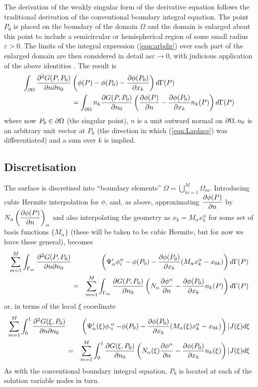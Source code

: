 The derivation of the weakly singular form of the derivative equation follows
the traditional derivation of the conventional boundary integral equation.
The point $P_{0}$ is placed on the boundary of the domain $\Omega$ and the
domain is enlarged about this point to include a semicircular or hemispherical
region of some small radius $\varepsilon > 0$.  The limits of the integral
expression (\ref{eqn:arbdir}) over each part of the enlarged domain are then
considered in detail as$\varepsilon \rightarrow 0$, with judicious application
of the above identities \cite{tomlinson:1996,liu:1991}.  The result is
\begin{eqnarray}
 \int_{\partial\Omega}\frac{\partial^{2}G(P,P_{0})}{\partial n\partial n_{0}}
  &\left(\phi(P)-\phi(P_{0})- \dfrac{\partial \phi(P_{0})}{\partial x_{k}} \right)
  d\Gamma(P)\nonumber\\
  &=\int_{\partial\Omega} n_{k} \dfrac{\partial G(P,P_{0})}{\partial n_{0}} \left(
   \dfrac{\partial \phi(P)}{\partial n} - \dfrac{\partial \phi(P_{0})}{\partial x_{k}} n_{k}(P)\right)
  d\Gamma(P)
 \label{eqn:result}
\end{eqnarray}
where now $P_{0}\in \partial\Omega$ (the singular point), $n$ is a unit outward
normal on $\partial\Omega, n_{0}$ is an arbitrary unit vector at $P_{0}$ (the
direction in which (\ref{eqn:Laplace}) was differentiated) and a sum over $k$
is implied.

\subsection{Discretisation}
The surface is discretised into ``boundary elements'' \ie $\Omega =
\displaystyle{\bigcup_{m=1}^{M}}\Omega_{m}$.  Introducing cubic Hermite
interpolation for $\phi $, and, as above, approximating $ \dfrac{\partial \phi(P)}{\partial n} $
by $N_{\alpha}\left( \dfrac{\partial \phi(P)}{\partial n} \right)_{\alpha}$ and also interpolating
the geometry as $x_{k} = M_{\alpha} x_{k}^{\alpha}$ for some set of basis
functions $\{M_{\alpha}\}$ (these will be taken to be cubic Hermite, but for
now we leave these general),  becomes
\begin{eqnarray}
  \sum_{m=1}^{M}\int_{\Gamma_{m}}\frac{\partial^{2}G(P,P_{0})} {\partial n\partial n_{0}}
  &&\left(\Psi_{\alpha}^{i}\phi_{i}^{\alpha}-\phi(P_{0})
    - \dfrac{\partial \phi(P_{0})}{\partial x_{k}} (M_{\alpha}x_{k}^{\alpha} - x_{0k})
  \right)d\Gamma(P)\nonumber\\ 
  &=&\sum_{m=1}^{M}\int_{\Gamma_{m}} \dfrac{\partial G(P,P_{0})}{\partial n_{0}} \left(
    N_{\alpha} \dfrac{\partial \phi^{\alpha}}{\partial n} - \dfrac{\partial \phi(P_{0})}{\partial x_{k}} 
    n_{k}(P)\right)d\Gamma(P)
 \label{eqn:result2}
\end{eqnarray}
or, in terms of the local $\xi$ coordinate
\begin{eqnarray}
 \sum_{m=1}^{M}\int_{0}^{1}\frac{\partial^{2}G(\xi,P_{0})}
  {\partial n\partial n_{0}}
  &&\left(\Psi_{\alpha}^{i}(\xi)\phi,_{i}^{\alpha}-\phi(P_{0})
  - \dfrac{\partial \phi(P_{0})}{\partial x_{k}} (M_{\alpha}(\xi)x_{k}^{\alpha} - x_{0k})
  \right)|J(\xi)d\xi\nonumber\\
 &=&\sum_{m=1}^{M}\int_{0}^{1} \dfrac{\partial G(\xi,P_{0})}{\partial n_{0}} \left(
  N_{\alpha}(\xi) \dfrac{\partial \phi^{\alpha}}{\partial n} 
  - \dfrac{\partial \phi(P_{0})}{\partial x_{k}} n_{k}(\xi)
  \right)|J(\xi)d\xi
 \label{eqn:result3}
\end{eqnarray}
As with the conventional boundary integral equation, $P_{0}$ is located at
each of the solution variable nodes in turn.


